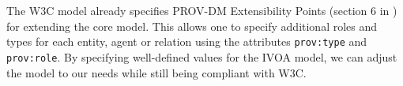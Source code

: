 The W3C model already specifies PROV-DM Extensibility Points (section 6 in
\citealt{std:W3CProvDM}) for extending the core model. This allows one to
specify additional roles and types for each entity, agent or relation using the
attributes \texttt{prov:type} and \texttt{prov:role}. By specifying well-defined
values for the IVOA model, we can adjust the model to our needs while still
being compliant with W3C.

